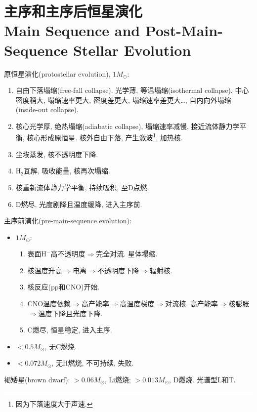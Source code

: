 \chapter{主序和主序后恒星演化\\Main Sequence and Post-Main-Sequence Stellar Evolution}

原恒星演化(protostellar evolution), $1M_\odot$:
\begin{enumerate}
    \item 自由下落塌缩(free-fall collapse). 光学薄, 等温塌缩(isothermal collapse). 中心密度稍大, 塌缩速率更大, 密度差更大, 塌缩速率差更大\dots, 自内向外塌缩(inside-out collapse).
    \item 核心光学厚, 绝热塌缩(adiabatic collapse), 塌缩速率减慢, 接近流体静力学平衡, 核心形成原恒星. 核外自由下落, 产生激波\footnote{因为下落速度大于声速.}, 加热核.
    \item 尘埃蒸发, 核不透明度下降.
    \item $\text{H}_2$瓦解, 吸收能量, 核再次塌缩.
    \item 核重新流体静力学平衡, 持续吸积, 至$\text{D}$点燃.
    \item $\text{D}$燃尽, 光度剧降且温度缓降, 进入主序前.
\end{enumerate}

主序前演化(pre-main-sequence evolution):
\begin{itemize}
    \item $1M_\odot$:
    \begin{enumerate}
        \item 表面$\text{H}^-$高不透明度$\Longrightarrow$完全对流. 星体塌缩.
        \item 核温度升高$\Longrightarrow$电离$\Longrightarrow$不透明度下降$\Longrightarrow$辐射核.
        \item 核反应(pp和CNO)开始.
        \item CNO温度依赖$\Longrightarrow$高产能率$\Longrightarrow$高温度梯度$\Longrightarrow$对流核.  高产能率$\Longrightarrow$核膨胀$\Longrightarrow$温度下降且光度下降.
        \item $\text{C}$燃尽, 恒星稳定, 进入主序.
    \end{enumerate}
    \item $<0.5M_\odot$, 无$\text{C}$燃烧.
    \item $<0.072M_\odot$, 无$\text{H}$燃烧, 不可持续, 失败.
\end{itemize}

褐矮星(brown dwarf): $>0.06M_\odot$, $\text{Li}$燃烧; $>0.013M_\odot$, $\text{D}$燃烧. 光谱型L和T.

